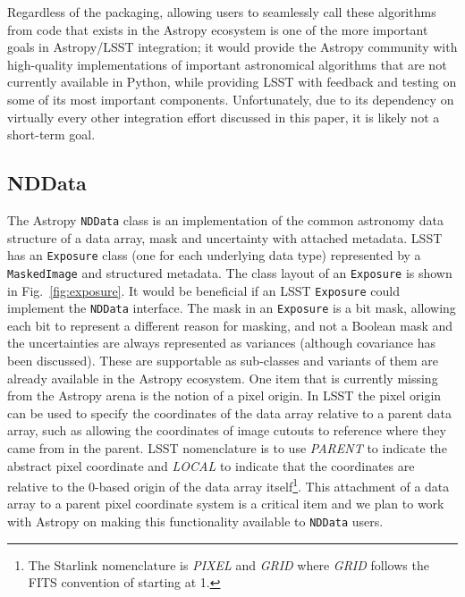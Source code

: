 \documentclass[]{spie}  %
\begin{document}
Regardless of the packaging, allowing users to seamlessly call these algorithms from code that exists in the Astropy ecosystem is one of the more important goals in Astropy/LSST integration; it would provide the Astropy community with high-quality implementations of important astronomical algorithms that are not currently available in Python, while providing LSST with feedback and testing on some of its most important components.
Unfortunately, due to its dependency on virtually every other integration effort discussed in this paper, it is likely not a short-term goal.

\subsection{NDData}

The Astropy \texttt{NDData} class is an implementation of the common astronomy data structure\cite{2015A&C....12..146J} of a data array, mask and uncertainty with attached metadata.
LSST has an \texttt{Exposure} class (one for each underlying data type) represented by a \texttt{MaskedImage} and structured metadata.
The class layout of an \texttt{Exposure} is shown in Fig.~\ref{fig:exposure}.
It would be beneficial if an LSST \texttt{Exposure} could implement the \texttt{NDData} interface.
The mask in an \texttt{Exposure} is a bit mask, allowing each bit to represent a different reason for masking, and not a Boolean mask and the uncertainties are always represented as variances (although covariance has been discussed).
These are supportable as sub-classes and variants of them are already available in the Astropy ecosystem.
One item that is currently missing from the Astropy arena is the notion of a pixel origin.
In LSST the pixel origin can be used to specify the coordinates of the data array relative to a parent data array, such as allowing the coordinates of image cutouts to reference where they came from in the parent.
LSST nomenclature is to use \emph{PARENT} to indicate the abstract pixel coordinate and \emph{LOCAL} to indicate that the coordinates are relative to the 0-based origin of the data array itself\footnote{The Starlink nomenclature\cite{2015A&C....12..146J} is \emph{PIXEL} and \emph{GRID} where \emph{GRID} follows the FITS convention of starting at 1.}.
This attachment of a data array to a parent pixel coordinate system is a critical item and we plan to work with Astropy on making this functionality available to \texttt{NDData} users.
\end{document}
